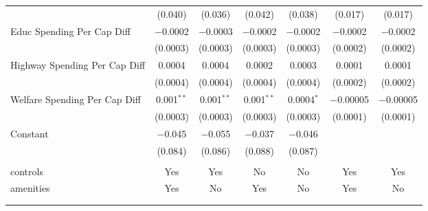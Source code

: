 \begin{table}[!htbp]
\begin{tabular}{@{\extracolsep{5pt}}lcccccc}
  & (0.040) & (0.036) & (0.042) & (0.038) & (0.017) & (0.017) \\ 
  Educ Spending Per Cap Diff & $-$0.0002 & $-$0.0003 & $-$0.0002 & $-$0.0002 & $-$0.0002 & $-$0.0002 \\ 
  & (0.0003) & (0.0003) & (0.0003) & (0.0003) & (0.0002) & (0.0002) \\ 
  Highway Spending Per Cap Diff & 0.0004 & 0.0004 & 0.0002 & 0.0003 & 0.0001 & 0.0001 \\ 
  & (0.0004) & (0.0004) & (0.0004) & (0.0004) & (0.0002) & (0.0002) \\ 
  Welfare Spending Per Cap Diff & 0.001$^{**}$ & 0.001$^{**}$ & 0.001$^{**}$ & 0.0004$^{*}$ & $-$0.00005 & $-$0.00005 \\ 
  & (0.0003) & (0.0003) & (0.0003) & (0.0003) & (0.0001) & (0.0001) \\ 
  Constant & $-$0.045 & $-$0.055 & $-$0.037 & $-$0.046 &  &  \\ 
  & (0.084) & (0.086) & (0.088) & (0.087) &  &  \\ 
 \hline \\[-1.8ex] 
controls & Yes & Yes & No & No & Yes & Yes \\ 
amenities & Yes & No & Yes & No & Yes & No \\ 
\hline \\[-1.8ex] 
\hline 
\hline \\[-1.8ex] 
\end{tabular} 
\end{table} 
